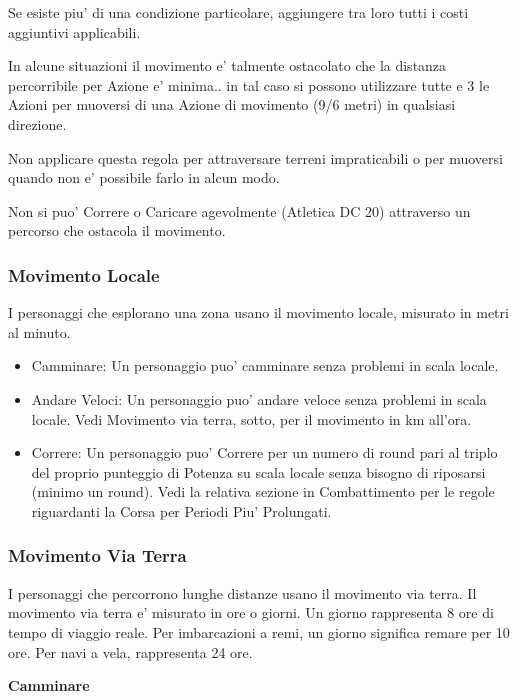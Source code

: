\documentclass[a4paper,11pt,twoside,openany]{book}
\begin{document}
{		Se esiste piu' di una condizione particolare, aggiungere tra loro tutti i costi aggiuntivi applicabili.
		
		In alcune situazioni il movimento e' talmente ostacolato che la distanza percorribile per Azione e' minima.. in tal caso si possono utilizzare tutte e 3 le Azioni per muoversi di una Azione di movimento (9/6 metri) in qualsiasi direzione.
		
		Non applicare questa regola per attraversare terreni impraticabili o per muoversi quando non e' possibile farlo in alcun modo. 
		
		Non si puo' Correre o Caricare agevolmente (Atletica DC 20) attraverso un percorso che ostacola il movimento.
		
		\subsubsection{Movimento Locale}
		
		I personaggi che esplorano una zona usano il movimento locale, misurato in metri al minuto.
		\begin{itemize}
			\item 
			Camminare: Un personaggio puo' camminare senza problemi in scala locale. 
			\item 
			Andare Veloci: Un personaggio puo' andare veloce senza problemi in scala locale. Vedi Movimento via terra, sotto, per il movimento in km all'ora. 
			\item 
			Correre: Un personaggio puo' Correre per un numero di round pari al triplo del proprio punteggio di Potenza su scala locale senza bisogno di riposarsi (minimo un round). Vedi la relativa sezione in Combattimento per le regole riguardanti la Corsa per Periodi Piu' Prolungati. 
		\end{itemize}
		
		\subsubsection{Movimento Via Terra}
		
		I personaggi che percorrono lunghe distanze usano il movimento via terra. Il movimento via terra e' misurato in ore o giorni. Un giorno rappresenta 8 ore di tempo di viaggio reale. Per imbarcazioni a remi, un giorno significa remare per 10 ore. Per navi a vela, rappresenta 24 ore.
		
		\textbf{Camminare}
		
}
\end{document}
